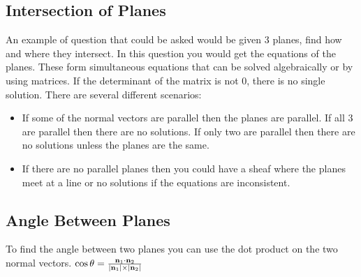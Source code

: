 \documentclass[class=article, crop=false]{standalone}
\begin{document}
\subsection*{Intersection of Planes}
An example of question that could be asked would be given 3 planes, find how and where they intersect. In this question you would get the equations of the planes. These form simultaneous equations that can be solved algebraically or by using matrices. If the determinant of the matrix is not 0, there is no single solution. There are several different scenarios:
\begin{itemize}
	\item If some of the normal vectors are parallel then the planes are parallel. If all 3 are parallel then there are no solutions. If only two are parallel then there are no solutions unless the planes are the same. 
	\item If there are no parallel planes then you could have a sheaf where the planes meet at a line or no solutions if the equations are inconsistent. 
\end{itemize}

\subsection*{Angle Between Planes}
To find the angle between two planes you can use the dot product on the two normal vectors.  $\cos \theta = \frac{\bold{n}_1 \cdot \bold{n}_2}{|\bold{n}_1| \times |\bold{n}_2|}$ 
\end{document}
